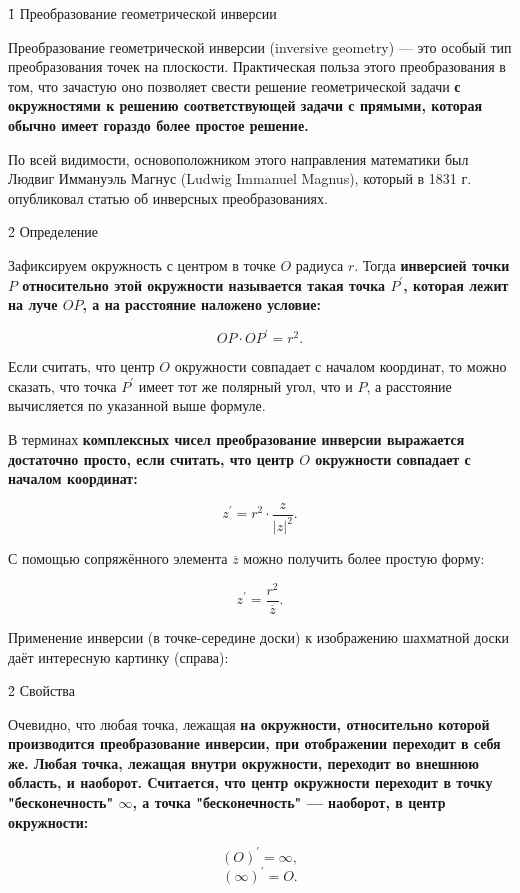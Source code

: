 \h1{ Преобразование геометрической инверсии }

Преобразование геометрической инверсии (inversive geometry) --- это особый тип преобразования точек на плоскости. Практическая польза этого преобразования в том, что зачастую оно позволяет свести решение геометрической задачи \bf{с окружностями} к решению соответствующей задачи \bf{с прямыми}, которая обычно имеет гораздо более простое решение.

По всей видимости, основоположником этого направления математики был Людвиг Иммануэль Магнус (Ludwig Immanuel Magnus), который в 1831 г. опубликовал статью об инверсных преобразованиях.


\h2{ Определение }

Зафиксируем окружность с центром в точке $O$ радиуса $r$. Тогда \bf{инверсией} точки $P$ относительно этой окружности называется такая точка $P^\prime$, которая лежит на луче $OP$, а на расстояние наложено условие:

$$ OP \cdot OP^\prime = r^2. $$


Если считать, что центр $O$ окружности совпадает с началом координат, то можно сказать, что точка $P^\prime$ имеет тот же полярный угол, что и $P$, а расстояние вычисляется по указанной выше формуле.

В терминах \bf{комплексных чисел} преобразование инверсии выражается достаточно просто, если считать, что центр $O$ окружности совпадает с началом координат:

$$ z^\prime = r^2 \cdot \frac{ z }{ |z|^2 }. $$

С помощью сопряжённого элемента $\overline{z}$ можно получить более простую форму:

$$ z^\prime = \frac{ r^2 }{ \overline{z} }. $$

Применение инверсии (в точке-середине доски) к изображению шахматной доски даёт интересную картинку (справа):



\h2{ Свойства }

Очевидно, что любая точка, лежащая \bf{на окружности}, относительно которой производится преобразование инверсии, при отображении переходит в себя же. Любая точка, лежащая \bf{внутри} окружности, переходит во \bf{внешнюю} область, и наоборот. Считается, что центр окружности переходит в точку "бесконечность" $\infty$, а точка "бесконечность" --- наоборот, в центр окружности:

$$ (O)^\prime = \infty, $$
$$ (\infty)^\prime = O. $$

